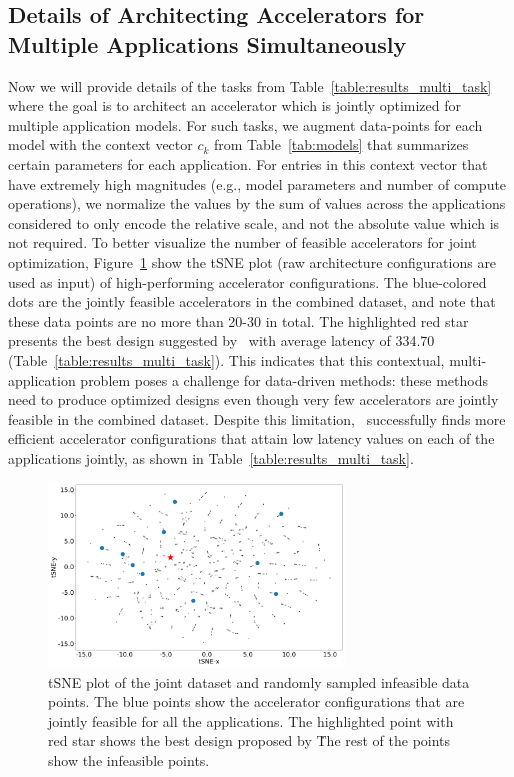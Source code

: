 %
\subsection{Details of Architecting Accelerators for Multiple Applications Simultaneously}
%
\label{sec:appx_multi_task_tsne}
Now we will provide details of the tasks from Table~\ref{table:results_multi_task} where the goal is to architect an accelerator which is jointly optimized for multiple application models.
%
For such tasks, we augment data-points for each model with the context vector $c_k$ from Table~\ref{tab:models} that summarizes certain parameters for each application.
%
For entries in this context vector that have extremely high magnitudes (e.g., model parameters and number of compute operations), we normalize the values by the sum of values across the applications considered to only encode the relative scale, and not the absolute value which is not required.
%
To better visualize the number of feasible accelerators for joint optimization, Figure~\ref{fig:tsne_overlap} show the tSNE plot (raw architecture configurations are used as input) of high-performing accelerator configurations. The blue-colored dots are the jointly feasible accelerators in the combined dataset, and note that these data points are no more than 20-30 in total. The highlighted red star presents the best design suggested by \primemethodname\ with average latency of 334.70 (Table~\ref{table:results_multi_task}).
%
This indicates that this contextual, multi-application problem poses a challenge for data-driven methods: these methods need to produce optimized designs even though very few accelerators are jointly feasible in the combined dataset.
% 
Despite this limitation, \primemethodname\ successfully finds more efficient accelerator configurations that attain low latency values on each of the applications jointly, as shown in Table~\ref{table:results_multi_task}.

\begin{figure}[t]
    \centering
    \includegraphics[width=0.7\textwidth]{figs/tsne/tsne-overlap.pdf}
    \caption{tSNE plot of the joint dataset and randomly sampled infeasible data points. The blue points show the accelerator configurations that are jointly feasible for all the applications. The highlighted point with red star shows the best design proposed by \primemethodname\. The rest of the points show the infeasible points.}
    \label{fig:tsne_overlap}
    \vspace{-0.1in}
\end{figure}
%

